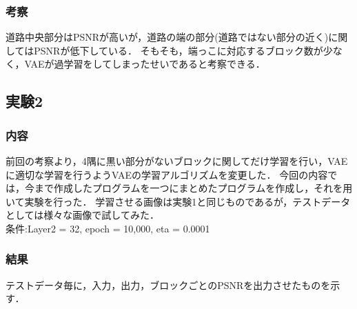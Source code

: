 \documentclass[twocolumn, a4j]{jsarticle}
\begin{document}
\subsubsection{考察}
道路中央部分はPSNRが高いが，道路の端の部分(道路ではない部分の近く)に関してはPSNRが低下している．
そもそも，端っこに対応するブロック数が少なく，VAEが過学習をしてしまったせいであると考察できる．

\subsection{実験2}
\subsubsection{内容}
前回の考察より，4隅に黒い部分がないブロックに関してだけ学習を行い，VAEに適切な学習を行うようVAEの学習アルゴリズムを変更した．
今回の内容では，今まで作成したプログラムを一つにまとめたプログラムを作成し，それを用いて実験を行った．
学習させる画像は実験1と同じものであるが，テストデータとしては様々な画像で試してみた．
\\条件:Layer2 = 32, epoch = 10,000, eta = 0.0001
\subsubsection{結果}
テストデータ毎に，入力，出力，ブロックごとのPSNRを出力させたものを示す．
\end{document}
